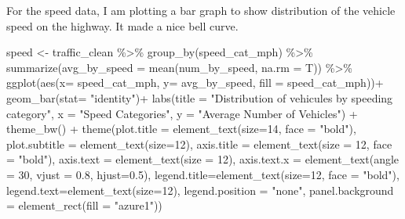 \documentclass[
  10pt,
  letterpaper,
]{article}
\newenvironment{Shaded}{\begin{snugshade}}{\end{snugshade}}
\newcommand{\AttributeTok}[1]{\textcolor[rgb]{0.40,0.45,0.13}{#1}}
\newcommand{\DecValTok}[1]{\textcolor[rgb]{0.68,0.00,0.00}{#1}}
\newcommand{\FloatTok}[1]{\textcolor[rgb]{0.68,0.00,0.00}{#1}}
\newcommand{\FunctionTok}[1]{\textcolor[rgb]{0.28,0.35,0.67}{#1}}
\newcommand{\NormalTok}[1]{\textcolor[rgb]{0.00,0.23,0.31}{#1}}
\newcommand{\OtherTok}[1]{\textcolor[rgb]{0.00,0.23,0.31}{#1}}
\newcommand{\SpecialCharTok}[1]{\textcolor[rgb]{0.37,0.37,0.37}{#1}}
\newcommand{\StringTok}[1]{\textcolor[rgb]{0.13,0.47,0.30}{#1}}
\begin{document}
For the speed data, I am plotting a bar graph to show distribution of
the vehicle speed on the highway. It made a nice bell curve.

\begin{Shaded}
\begin{Highlighting}[]
\NormalTok{speed }\OtherTok{\textless{}{-}}\NormalTok{ traffic\_clean }\SpecialCharTok{\%\textgreater{}\%} \FunctionTok{group\_by}\NormalTok{(speed\_cat\_mph) }\SpecialCharTok{\%\textgreater{}\%} 
  \FunctionTok{summarize}\NormalTok{(}\AttributeTok{avg\_by\_speed =} \FunctionTok{mean}\NormalTok{(num\_by\_speed, }\AttributeTok{na.rm =}\NormalTok{ T)) }\SpecialCharTok{\%\textgreater{}\%} 
  \FunctionTok{ggplot}\NormalTok{(}\FunctionTok{aes}\NormalTok{(}\AttributeTok{x=}\NormalTok{ speed\_cat\_mph, }\AttributeTok{y=}\NormalTok{ avg\_by\_speed, }\AttributeTok{fill =}\NormalTok{ speed\_cat\_mph))}\SpecialCharTok{+}
  \FunctionTok{geom\_bar}\NormalTok{(}\AttributeTok{stat=} \StringTok{"identity"}\NormalTok{)}\SpecialCharTok{+}
  \FunctionTok{labs}\NormalTok{(}\AttributeTok{title =} \StringTok{"Distribution of vehicules by speeding category"}\NormalTok{,}
       \AttributeTok{x =} \StringTok{"Speed Categories"}\NormalTok{,}
       \AttributeTok{y =} \StringTok{"Average Number of Vehicles"}\NormalTok{) }\SpecialCharTok{+}
  \FunctionTok{theme\_bw}\NormalTok{() }\SpecialCharTok{+} 
  \FunctionTok{theme}\NormalTok{(}\AttributeTok{plot.title =} \FunctionTok{element\_text}\NormalTok{(}\AttributeTok{size=}\DecValTok{14}\NormalTok{, }\AttributeTok{face =} \StringTok{"bold"}\NormalTok{), }
        \AttributeTok{plot.subtitle =} \FunctionTok{element\_text}\NormalTok{(}\AttributeTok{size=}\DecValTok{12}\NormalTok{),}
        \AttributeTok{axis.title =} \FunctionTok{element\_text}\NormalTok{(}\AttributeTok{size =} \DecValTok{12}\NormalTok{, }\AttributeTok{face =} \StringTok{"bold"}\NormalTok{),}
        \AttributeTok{axis.text =} \FunctionTok{element\_text}\NormalTok{(}\AttributeTok{size =} \DecValTok{12}\NormalTok{),}
        \AttributeTok{axis.text.x =} \FunctionTok{element\_text}\NormalTok{(}\AttributeTok{angle =} \DecValTok{30}\NormalTok{, }\AttributeTok{vjust =} \FloatTok{0.8}\NormalTok{, }\AttributeTok{hjust=}\FloatTok{0.5}\NormalTok{),}
        \AttributeTok{legend.title=}\FunctionTok{element\_text}\NormalTok{(}\AttributeTok{size=}\DecValTok{12}\NormalTok{, }\AttributeTok{face =} \StringTok{"bold"}\NormalTok{),}
        \AttributeTok{legend.text=}\FunctionTok{element\_text}\NormalTok{(}\AttributeTok{size=}\DecValTok{12}\NormalTok{),}
        \AttributeTok{legend.position =} \StringTok{"none"}\NormalTok{,}
        \AttributeTok{panel.background =} \FunctionTok{element\_rect}\NormalTok{(}\AttributeTok{fill =} \StringTok{"azure1"}\NormalTok{))}
\end{Highlighting}
\end{Shaded}
\end{document}
